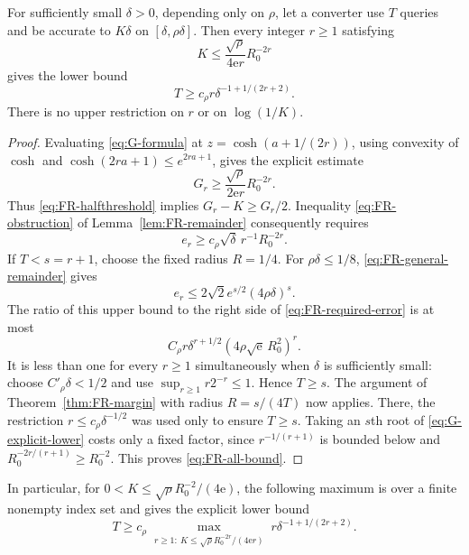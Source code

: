 \begin{theorem}\label{thm:FR-all}
For sufficiently small $\delta>0$, depending only on $\rho$, let a converter use $T$ queries and be accurate to $K\delta$ on $[\delta,\rho\delta]$. Then every integer $r\geq1$ satisfying
\begin{equation}\label{eq:FR-halfthreshold}
 K\leq\frac{\sqrt\rho}{4\mathrm e r}R_0^{-2r}
\end{equation}
gives the lower bound
\begin{equation}\label{eq:FR-all-bound}
 T\geq c_\rho r\delta^{-1+1/(2r+2)}.
\end{equation}
There is no upper restriction on $r$ or on $\log(1/K)$.
\end{theorem}
\begin{proof}
Evaluating \eqref{eq:G-formula} at $z=\cosh(a+1/(2r))$, using convexity of $\cosh$ and $\cosh(2ra+1)\leq e^{2ra+1}$, gives the explicit estimate
\begin{equation}\label{eq:G-explicit-lower}
 G_r\geq \frac{\sqrt\rho}{2\mathrm e r}R_0^{-2r}.
\end{equation}
Thus \eqref{eq:FR-halfthreshold} implies $G_r-K\geq G_r/2$. Inequality \eqref{eq:FR-obstruction} of Lemma~\ref{lem:FR-remainder} consequently requires
\begin{equation}\label{eq:FR-required-error}
 e_r\geq c_\rho\sqrt\delta\,r^{-1}R_0^{-2r}.
\end{equation}
If $T<s=r+1$, choose the fixed radius $R=1/4$. For $\rho\delta\leq1/8$, \eqref{eq:FR-general-remainder} gives
\[
 e_r\leq2\sqrt2 e^{s/2}(4\rho\delta)^s.
\]
The ratio of this upper bound to the right side of \eqref{eq:FR-required-error} is at most
\[
 C_\rho r\delta^{r+1/2}
             (4\rho\sqrt{\mathrm e}\,R_0^2)^r.
\]
It is less than one for every $r\geq1$ simultaneously when $\delta$ is sufficiently small: choose $C'_\rho\delta<1/2$ and use $\sup_{r\geq1}r2^{-r}\leq1$. Hence $T\geq s$. The argument of Theorem~\ref{thm:FR-margin} with radius $R=s/(4T)$ now applies. There, the restriction $r\leq c_\rho\delta^{-1/2}$ was used only to ensure $T\geq s$. Taking an $s$th root of \eqref{eq:G-explicit-lower} costs only a fixed factor, since $r^{-1/(r+1)}$ is bounded below and $R_0^{-2r/(r+1)}\geq R_0^{-2}$. This proves \eqref{eq:FR-all-bound}.
\end{proof}
In particular, for $0<K\leq\sqrt\rho R_0^{-2}/(4\mathrm e)$, the following maximum is over a finite nonempty index set and gives the explicit lower bound
\begin{equation}\label{eq:FR-max}
 T\geq c_\rho\max_{\substack{r\geq1:\
 K\leq\sqrt\rho R_0^{-2r}/(4\mathrm e r)}}
 r\delta^{-1+1/(2r+2)}.
\end{equation}

